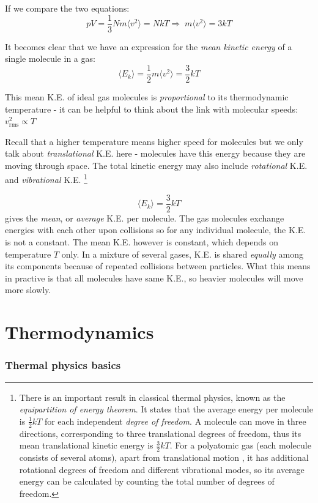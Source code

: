\documentclass[a4paper,12pt]{book}
\newcommand{\avg}[1]{\langle#1\rangle}
\newcommand{\RA}{\Rightarrow\;}
\newcommand{\tcbhighmath}[1]{\boxed{#1}}
\begin{document}
If we compare the two equations: $$pV=\frac{1}{3}Nm\avg{v^2}=NkT \RA m\avg{v^2}=3kT$$

It becomes clear that we have an expression for the \emph{mean kinetic energy} of a single molecule in a gas: $$\tcbhighmath{\avg{E_k}=\frac{1}{2}m\avg{v^2}=\frac{3}{2}kT}$$

This mean K.E. of ideal gas molecules is \emph{proportional} to its thermodynamic temperature - it can be helpful to think about the link with molecular speeds: $\tcbhighmath{v_\text{rms}^2 \propto T}$

Recall that a higher temperature means higher speed for molecules but we only talk about \emph{translational} K.E. here - molecules have this energy because they are moving through space. The total kinetic energy may also include \emph{rotational} K.E. and \emph{vibrational} K.E.
\footnote{There is an important result in classical thermal physics, known as the \emph{equipartition of energy theorem}. It states that the average energy per molecule is $\frac{1}{2}kT$ for each independent \emph{degree of freedom}. A molecule can move in three directions, corresponding to three translational degrees of freedom, thus its mean translational kinetic energy is $\frac{3}{2}kT$. For a polyatomic gas (each molecule consists of several atoms), apart from translational motion , it has additional rotational degrees of freedom and different vibrational modes, so its average energy can be calculated by counting the total number of degrees of freedom.}

$$\avg{E_k} = \frac{3}{2}k T$$ gives the \emph{mean}, or \emph{average} K.E. per molecule. The gas molecules exchange energies with each other upon collisions so for any individual molecule, the K.E. is not a constant. The mean K.E. however is constant, which depends on temperature $T$ only. In a mixture of several gases, K.E. is shared \emph{equally} among its components because of repeated collisions between particles. What this means in practive is that all molecules have same K.E., so heavier molecules will move more slowly.

\cleardoublepage

\chapter{Thermodynamics}

\subsection{Thermal physics basics}
\end{document}
